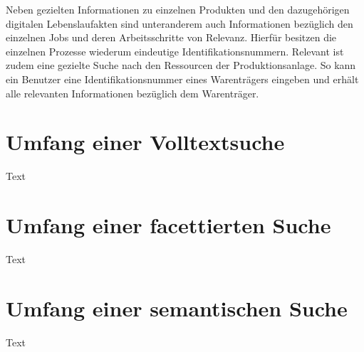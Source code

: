 Neben gezielten Informationen zu einzelnen Produkten und den dazugehörigen digitalen Lebenslaufakten sind unteranderem auch Informationen bezüglich den einzelnen Jobs und deren Arbeitsschritte von Relevanz. Hierfür besitzen die einzelnen Prozesse wiederum eindeutige Identifikationsnummern. Relevant ist zudem eine gezielte Suche nach den Ressourcen der Produktionsanlage. So kann ein Benutzer eine Identifikationsnummer eines Warenträgers eingeben und erhält alle relevanten Informationen bezüglich dem Warenträger.


\section{Umfang einer Volltextsuche\label{sec3.2:Unterunterpunkt-2}}

Text


\section{Umfang einer facettierten Suche\label{sec3.3:Unterpunkt-3}}

Text

% 

\section{Umfang einer semantischen Suche\label{sec3.4:Unterpunkt-4}}

Text

% 